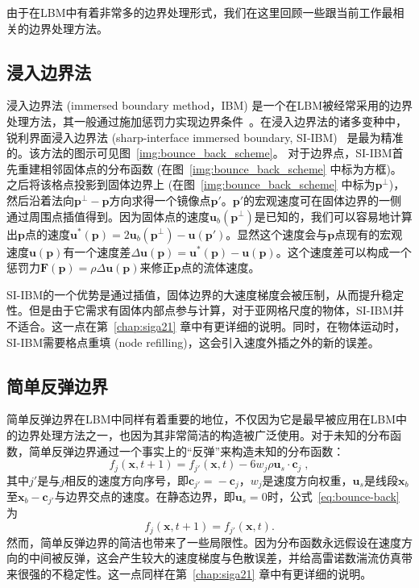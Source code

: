 由于在LBM中有着非常多的边界处理形式，我们在这里回顾一些跟当前工作最相关的边界处理方法。

\subsection{浸入边界法}
浸入边界法 (immersed boundary method，IBM) 是一个在LBM被经常采用的边界处理方法，其一般通过施加惩罚力实现边界条件~\citep{patel2018diffuse,mittal-2008,Li-2020}。在浸入边界法的诸多变种中，锐利界面浸入边界法 (sharp-interface immersed boundary, SI-IBM)~\citep{mittal-2008} 是最为精准的。该方法的图示可见图~\ref{img:bounce_back_scheme}。
对于边界点，SI-IBM首先重建相邻固体点的分布函数 (在图~\ref{img:bounce_back_scheme} 中标为方框)。之后将该格点投影到固体边界上 (在图~\ref{img:bounce_back_scheme} 中标为$\bm{p}^\perp$)，然后沿着法向$\bm{p}^\perp\!-\!\bm{p}$方向求得一个镜像点$\bm{p}'$。$\bm{p}'$的宏观速度可在固体边界的一侧通过周围点插值得到。因为固体点的速度$\bm{u}_b(\bm{p}^\perp)$是已知的，我们可以容易地计算出$\bm{p}$点的速度$\bm{u}^*(\bm{p}) = 2\bm{u}_b(\bm{p}^\perp) - \bm{u}(\bm{p}')$。显然这个速度会与$\bm{p}$点现有的宏观速度$\bm{u}(\bm{p})$有一个速度差$\Delta\bm{u}(\bm{p}) = \bm{u}^*(\bm{p}) - \bm{u}(\bm{p})$。这个速度差可以构成一个惩罚力$\bm{F}(\bm{p}) = \rho\Delta\bm{u}(\bm{p})$来修正$\bm{p}$点的流体速度。

SI-IBM的一个优势是通过插值，固体边界的大速度梯度会被压制，从而提升稳定性。但是由于它需求有固体内部点参与计算，对于亚网格尺度的物体，SI-IBM并不适合。这一点在第~\ref{chap:siga21} 章中有更详细的说明。同时，在物体运动时，SI-IBM需要格点重填 (node refilling)，这会引入速度外插之外的新的误差。

\subsection{简单反弹边界}
简单反弹边界在LBM中同样有着重要的地位，不仅因为它是最早被应用在LBM中的边界处理方法之一，也因为其非常简洁的构造被广泛使用。对于未知的分布函数，简单反弹边界通过一个事实上的“反弹”来构造未知的分布函数：
\begin{equation}\label{eq:bounce-back}
f_{j}(\bm{x},t+1) = f_{j'}(\bm{x},t) - 6 w_{j}\rho\bm{u}_s \cdot \bm{c}_{j}\;,
\end{equation}
其中$j'$是与$j$相反的速度方向序号，即$\bm{c}_{j'}\!=\!-\bm{c}_j$，$w_j$是速度方向权重，$\bm{u}_s$是线段$\bm{x}_b$至$\bm{x}_b-\bm{c}_{j'}$与边界交点的速度。在静态边界，即$\bm{u}_s=0$时，公式~\ref{eq:bounce-back} 为
\begin{equation}
    f_{j}(\bm{x},t+1) = f_{j'}(\bm{x},t).
\end{equation}
然而，简单反弹边界的简洁也带来了一些局限性。因为分布函数永远假设在速度方向的中间被反弹，这会产生较大的速度梯度与色散误差，并给高雷诺数湍流仿真带来很强的不稳定性。这一点同样在第~\ref{chap:siga21} 章中有更详细的说明。

